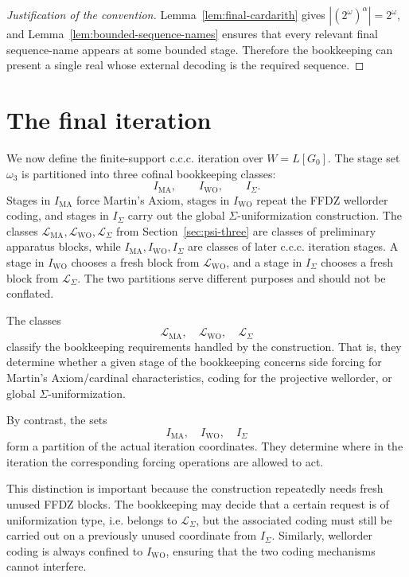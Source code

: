 \documentclass[11pt]{article}
\theoremstyle{plain}
\theoremstyle{definition}
\theoremstyle{remark}
\newcommand{\Wground}{W}
\begin{document}
\begin{proof}[Justification of the convention]
Lemma~\ref{lem:final-cardarith} gives $|(2^\omega)^\alpha|=2^\omega$, and
Lemma~\ref{lem:bounded-sequence-names} ensures that every relevant final
sequence-name appears at some bounded stage.  Therefore the bookkeeping can
present a single real whose external decoding is the required sequence.
\end{proof}


\section{The final iteration}\label{sec:iteration}

We now define the finite-support c.c.c. iteration over $\Wground=L[G_0]$.  The
stage set $\omega_3$ is partitioned into three cofinal bookkeeping classes:
\[
I_{\mathrm{MA}},\qquad I_{\mathrm{WO}},\qquad I_\Sigma.
\]
Stages in $I_{\mathrm{MA}}$ force Martin's Axiom, stages in $I_{\mathrm{WO}}$
repeat the FFDZ wellorder coding, and stages in $I_\Sigma$ carry out the global
$\Sigma$-uniformization construction.  The classes
$\mathcal L_{\mathrm{MA}},\mathcal L_{\mathrm{WO}},\mathcal L_\Sigma$ from
Section~\ref{sec:psi-three} are classes of preliminary apparatus blocks, while
$I_{\mathrm{MA}},I_{\mathrm{WO}},I_\Sigma$ are classes of later c.c.c. iteration
stages.  A stage in $I_{\mathrm{WO}}$ chooses a fresh block from
$\mathcal L_{\mathrm{WO}}$, and a stage in $I_\Sigma$ chooses a fresh block from
$\mathcal L_\Sigma$. The two partitions serve different purposes and should not be conflated.

The classes
\[
\mathcal L_{\mathrm{MA}},\quad
\mathcal L_{\mathrm{WO}},\quad
\mathcal L_{\Sigma}
\]
classify the bookkeeping requirements handled by the construction. That is, they
determine whether a given stage of the bookkeeping concerns side forcing for
Martin's Axiom/cardinal characteristics, coding for the projective wellorder,
or global \(\Sigma\)-uniformization.

By contrast, the sets
\[
I_{\mathrm{MA}},\quad
I_{\mathrm{WO}},\quad
I_{\Sigma}
\]
form a partition of the actual iteration coordinates. They determine where in the
iteration the corresponding forcing operations are allowed to act.

This distinction is important because the construction repeatedly needs fresh
unused FFDZ blocks. The bookkeeping may decide that a certain request is of
uniformization type, i.e. belongs to \(\mathcal L_{\Sigma}\), but the associated
coding must still be carried out on a previously unused coordinate from
\(I_{\Sigma}\). Similarly, wellorder coding is always confined to
\(I_{\mathrm{WO}}\), ensuring that the two coding mechanisms cannot interfere.
\end{document}
